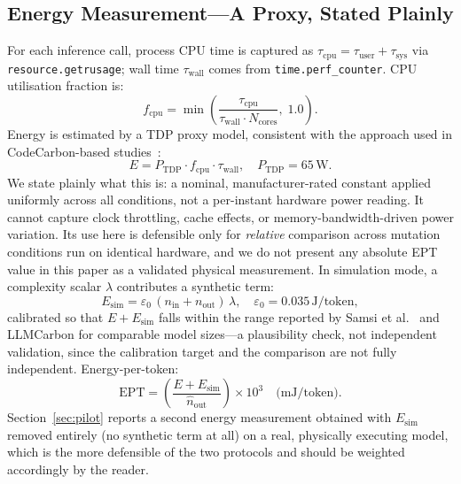 \documentclass[conference]{IEEEtran}
\begin{document}
\subsection{Energy Measurement---A Proxy, Stated Plainly}
For each inference call, process CPU time is captured as
$\tau_\text{cpu} = \tau_\text{user} + \tau_\text{sys}$ via
\texttt{resource.getrusage}; wall time $\tau_\text{wall}$ comes from
\texttt{time.perf\_counter}. CPU utilisation fraction is:
\begin{equation}
  f_\text{cpu} = \min\!\left(
    \frac{\tau_\text{cpu}}{\tau_\text{wall} \cdot N_\text{cores}},\;
    1.0\right).
  \label{eq:frac}
\end{equation}
Energy is estimated by a TDP proxy model, consistent with the approach
used in CodeCarbon-based studies~\cite{bannour2021evaluating}:
\begin{equation}
  E = P_\text{TDP} \cdot f_\text{cpu} \cdot \tau_\text{wall},
  \quad P_\text{TDP} = 65\,\text{W}.
  \label{eq:energy}
\end{equation}
We state plainly what this is: a nominal, manufacturer-rated constant
applied uniformly across all conditions, not a per-instant hardware
power reading. It cannot capture clock throttling, cache effects, or
memory-bandwidth-driven power variation. Its use here is defensible
only for \emph{relative} comparison across mutation conditions run on
identical hardware, and we do not present any absolute EPT value in
this paper as a validated physical measurement. In simulation mode, a
complexity scalar $\lambda$ contributes a synthetic term:
\begin{equation}
  E_\text{sim} = \varepsilon_0\,(n_\text{in} + n_\text{out})\,\lambda,
  \quad \varepsilon_0 = 0.035\,\text{J/token},
  \label{eq:sim}
\end{equation}
calibrated so that $E + E_\text{sim}$ falls within the range reported
by Samsi et al.~\cite{samsi2023words} and LLMCarbon
\cite{faiz2024llmcarbon} for comparable model sizes---a plausibility
check, not independent validation, since the calibration target and
the comparison are not fully independent. Energy-per-token:
\begin{equation}
  \mathrm{EPT} = \left(\frac{E + E_\text{sim}}{\hat{n}_\text{out}}\right)
  \times 10^3 \quad\text{(mJ/token)}.
  \label{eq:ept}
\end{equation}
Section~\ref{sec:pilot} reports a second energy measurement obtained
with $E_\text{sim}$ removed entirely (no synthetic term at all) on a
real, physically executing model, which is the more defensible of the
two protocols and should be weighted accordingly by the reader.
\end{document}
